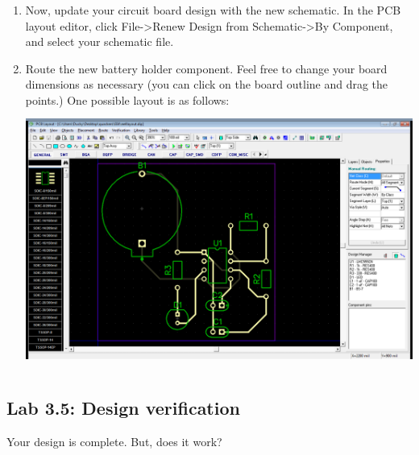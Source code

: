 \documentclass[letterpaper]{article}
\begin{document}
\begin{enumerate}
{}
\item {\sffamily\color[rgb]{0.30980393,0.5058824,0.7411765}
Now, update your circuit board design with the new schematic. In the PCB layout editor, click File-{\textgreater}Renew
Design from Schematic-{\textgreater}By Component, and select your schematic file.}
\item {\sffamily\color[rgb]{0.30980393,0.5058824,0.7411765}
Route the new battery holder component. Feel free to change your board dimensions as necessary (you can click on the
board outline and drag the points.) One possible layout is as follows:\newline
 \includegraphics[width=5.4in,height=3.3665in]{figures/ee4document-img028.png} }
\end{enumerate}

\bigskip

\subsection[Lab 3.5: Design verification]{Lab 3.5: Design verification}
\hypertarget{Toc337742700}{}{\sffamily\color[rgb]{0.30980393,0.5058824,0.7411765}
Your design is complete. But, does it work?}


\bigskip
\end{document}
